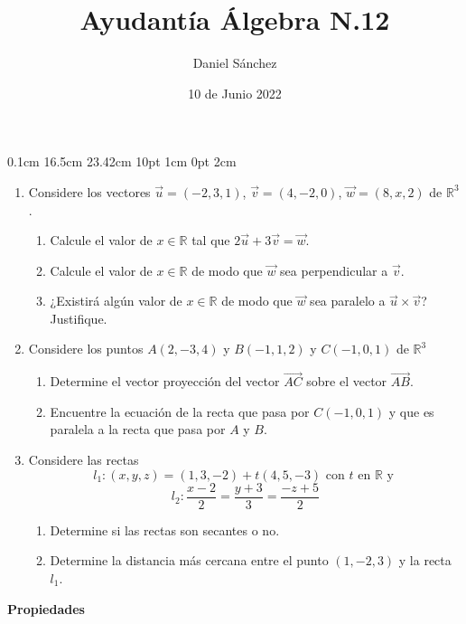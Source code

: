 \documentclass[12pt]{article}
\newcommand{\D}{\displaystyle}
\begin{document}
\setmargins{2.5cm}
{0.1cm}
{16.5cm}
{23.42cm}
{10pt}
{1cm}
{0pt}
{2cm}

\title{Ayudant\'ia \'Algebra N.12}
\date{10 de Junio 2022}
\author{Daniel S\'anchez}
\maketitle

\begin{enumerate}
      \item Considere los vectores $\vec{u} = (-2,3,1)$, $\vec{v} = (4,-2,0)$, $\vec{w} = (8,x,2)$ de $\mathbb{R}^3$.
            \begin{enumerate}
                  \item Calcule el valor de $x \in \mathbb{R}$ tal que $2\vec{u} + 3\vec{v} = \vec{w}$.
                  \item Calcule el valor de $x \in \mathbb{R}$ de modo que $\vec{w}$ sea perpendicular a $\vec{v}$.
                  \item ¿Existir\'a alg\'un valor de $x \in \mathbb{R}$ de modo que $\vec{w}$ sea paralelo a $\vec{u} \times \vec{v}$? Justifique.
            \end{enumerate}
      \item Considere los puntos $A(2,-3,4)$ y $B(-1,1,2)$ y $C(-1,0,1)$ de $\mathbb{R}^3$
            \begin{enumerate}
                  \item Determine el vector proyecci\'on del vector $\overrightarrow{AC}$ sobre el vector $\overrightarrow{AB}$.
                  \item Encuentre la ecuaci\'on de la recta que pasa por $C(-1,0,1)$ y que es paralela a la recta que pasa por $A$ y $B$.
            \end{enumerate}
      \item Considere las rectas
            $$l_1 : (x,y,z) = (1,3,-2) + t(4,5,-3) \mbox{ con $t$ en $\mathbb{R}$ y }$$
            $$\D l_2 : \frac{x-2}{2} = \frac{y+3}{3} = \frac{-z+5}{2}$$
            \begin{enumerate}
                  \item Determine si las rectas son secantes o no.
                  \item Determine la distancia m\'as cercana entre el punto $(1,-2,3)$ y la recta $l_1$.
            \end{enumerate}
\end{enumerate}
\pagebreak
\textbf{Propiedades}
\end{document}
